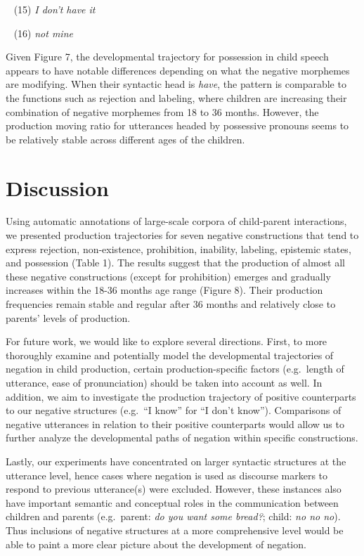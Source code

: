 \documentclass[10pt, letterpaper]{article}
\begin{document}
~ (15) \emph{I don't have it}

~ (16) \emph{not mine}

Given Figure 7, the developmental trajectory for possession in child
speech appears to have notable differences depending on what the
negative morphemes are modifying. When their syntactic head is
\emph{have}, the pattern is comparable to the functions such as
rejection and labeling, where children are increasing their combination
of negative morphemes from 18 to 36 months. However, the production
moving ratio for utterances headed by possessive pronouns seems to be
relatively stable across different ages of the children.

\hypertarget{discussion}{%
\section{Discussion}\label{discussion}}

Using automatic annotations of large-scale corpora of child-parent
interactions, we presented production trajectories for seven negative
constructions that tend to express rejection, non-existence,
prohibition, inability, labeling, epistemic states, and possession
(Table 1). The results suggest that the production of almost all these
negative constructions (except for prohibition) emerges and gradually
increases within the 18-36 months age range (Figure 8). Their production
frequencies remain stable and regular after 36 months and relatively
close to parents' levels of production.

For future work, we would like to explore several directions. First, to
more thoroughly examine and potentially model the developmental
trajectories of negation in child production, certain
production-specific factors (e.g.~length of utterance, ease of
pronunciation) should be taken into account as well. In addition, we aim
to investigate the production trajectory of positive counterparts to our
negative structures (e.g.~``I know'' for ``I don't know''). Comparisons
of negative utterances in relation to their positive counterparts would
allow us to further analyze the developmental paths of negation within
specific constructions.

Lastly, our experiments have concentrated on larger syntactic structures
at the utterance level, hence cases where negation is used as discourse
markers to respond to previous utterance(s) were excluded. However,
these instances also have important semantic and conceptual roles in the
communication between children and parents (e.g.~parent: \emph{do you
want some bread?}; child: \emph{no no no}). Thus inclusions of negative
structures at a more comprehensive level would be able to paint a more
clear picture about the development of negation.
\end{document}

